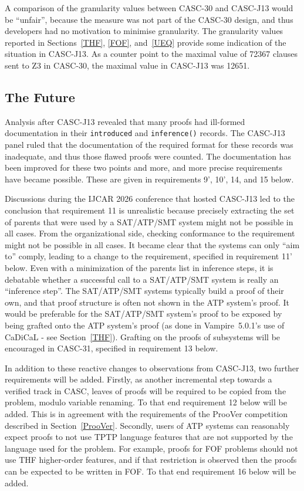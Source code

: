 \documentclass[aic]{iosart2x}
\newcommand{\smalltt}[1]{\small \texttt{#1}}
\newcommand{\LAST}{\mbox{CASC-30}}
\newcommand{\THIS}{\mbox{CASC-J13}}
\newcommand{\NEXT}{\mbox{CASC-31}}
\begin{document}
A comparison of the granularity values between \LAST{} and \THIS{} would be ``unfair'', because
the measure was not part of the \LAST{} design, and thus developers had no motivation to minimise
granularity.
The granularity values reported in Sections~\ref{THF}, \ref{FOF}, and~\ref{UEQ} provide
some indication of the situation in \THIS{}.
As a counter point to the maximal value of 72367 clauses sent to Z3 in \LAST{}, the maximal value 
in \THIS{} was 12651.

\subsection{The Future}
\label{FutureProofs}

Analysis after \THIS{} revealed that many proofs had ill-formed documentation in their 
\smalltt{introduced{}} and \smalltt{inference()} records.
The \THIS{} panel ruled that the documentation of the required format for these records was 
inadequate, and thus those flawed proofs were counted.
The documentation has been improved for these two points and more, and more precise requirements 
have became possible.
These are given in requirements 9', 10', 14, and 15 below.

Discussions during the IJCAR 2026 conference that hosted \THIS{} led to the conclusion that 
requirement 11 is unrealistic because precisely extracting the set of parents that were used 
by a SAT/ATP/SMT system might not be possible in all cases.
From the organizational side, checking conformance to the requirement might not be possible in 
all cases. 
It became clear that the systems can only ``aim to'' comply, leading to a change to the 
requirement, specified in requirement 11' below.
Even with a minimization of the parents list in inference steps, it is debatable whether a 
successful call to a SAT/ATP/SMT system is really an ``inference step''.
The SAT/ATP/SMT systems typically build a proof of their own, and that proof structure is often not 
shown in the ATP system's proof.
It would be preferable for the SAT/ATP/SMT system's proof to be exposed by being grafted onto the
ATP system's proof (as done in Vampire~5.0.1's use of CaDiCaL - see Section~\ref{THF}).
Grafting on the proofs of subsystems will be encouraged in \NEXT{}, specified in requirement
13 below.

In addition to these reactive changes to observations from \THIS{}, two further requirements
will be added.
Firstly, as another incremental step towards a verified track in CASC, leaves of proofs will
be required to be copied from the problem, modulo variable renaming.
To that end requirement 12 below will be added.
This is in agreement with the requirements of the ProoVer competition described in 
Section~\ref{ProoVer}.
Secondly, users of ATP systems can reasonably expect proofs to not use TPTP language features
that are not supported by the language used for the problem.
For example, proofs for FOF problems should not use THF higher-order features, and if that
restriction is observed then the proofs can be expected to be written in FOF.
To that end requirement 16 below will be added.
\end{document}
